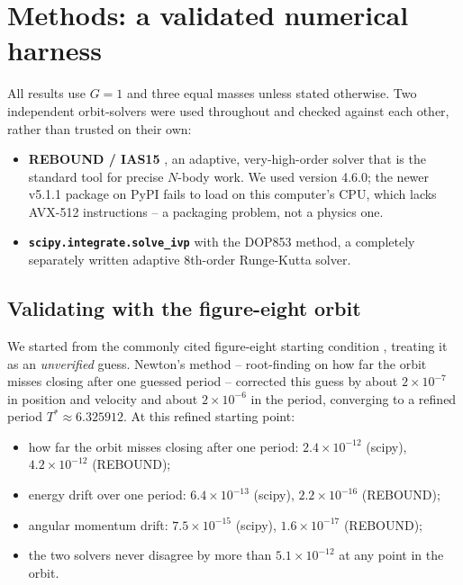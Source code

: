 \documentclass[11pt]{article}
\begin{document}
\section{Methods: a validated numerical harness}
\label{sec:methods}

All results use $G=1$ and three equal masses unless stated otherwise. Two
independent orbit-solvers were used throughout and checked against each
other, rather than trusted on their own:

\begin{itemize}
  \item \textbf{REBOUND / IAS15} \cite{ReinSpiegel2015}, an adaptive,
    very-high-order solver that is the standard tool for precise $N$-body
    work. We used version 4.6.0; the newer v5.1.1 package on PyPI fails
    to load on this computer's CPU, which lacks AVX-512 instructions --
    a packaging problem, not a physics one.
  \item \textbf{\texttt{scipy.integrate.solve\_ivp}} with the DOP853
    method, a completely separately written adaptive 8th-order
    Runge-Kutta solver.
\end{itemize}

\subsection{Validating with the figure-eight orbit}
\label{sec:figure8}

We started from the commonly cited figure-eight starting condition
\cite{Moore1993,ChencinerMontgomery2000}, treating it as an
\emph{unverified} guess. Newton's method -- root-finding on how far the
orbit misses closing after one guessed period -- corrected this guess by
about $2\times10^{-7}$ in position and velocity and about $2\times10^{-6}$
in the period, converging to a refined period $T^\ast \approx 6.325912$.
At this refined starting point:

\begin{itemize}
  \item how far the orbit misses closing after one period:
    $2.4\times10^{-12}$ (scipy), $4.2\times10^{-12}$ (REBOUND);
  \item energy drift over one period: $6.4\times10^{-13}$ (scipy),
    $2.2\times10^{-16}$ (REBOUND);
  \item angular momentum drift: $7.5\times10^{-15}$ (scipy),
    $1.6\times10^{-17}$ (REBOUND);
  \item the two solvers never disagree by more than $5.1\times10^{-12}$
    at any point in the orbit.
\end{itemize}
\end{document}
